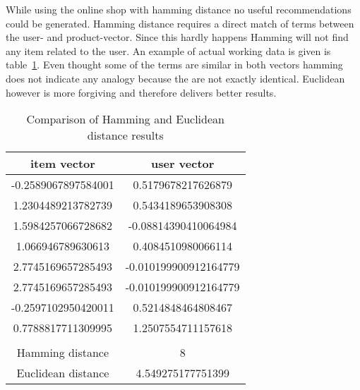 While using the online shop with hamming distance no useful recommendations could be generated.
Hamming distance requires a direct match of terms between the user- and product-vector.
Since this hardly happens Hamming will not find any item related to the user.
An example of actual working data is given is table~\ref{tab:hamming-vs-euclidean}.
Even thought some of the terms are similar in both vectors hamming does not indicate any analogy because the are not exactly identical.
Euclidean however is more forgiving and therefore delivers better results.

\begin{table}

    \center

    \begin{tabular}{ c | c }
        \rowcolor{\dustRowHead}
        item vector         & user vector\\\hline
        -0.2589067897584001 & 0.5179678217626879\\
        1.2304489213782739  & 0.5434189653908308\\
        1.5984257066728682  & -0.08814390410064984\\
        1.066946789630613   & 0.4084510980066114\\
        2.7745169657285493  & -0.010199900912164779\\
        2.7745169657285493  & -0.010199900912164779\\
        -0.2597102950420011 & 0.5214848464808467\\
        0.7788817711309995  & 1.2507554711157618\\
        \hline
        \rowcolor{\dustRowHead}
        \multicolumn{2}{ c }{resulting distance}\\
        \hline
        Hamming distance    & 8\\
        Euclidean distance  & 4.549275177751399\\
    \end{tabular}

    \caption{Comparison of Hamming and Euclidean distance results}
    \label{tab:hamming-vs-euclidean}
\end{table}



